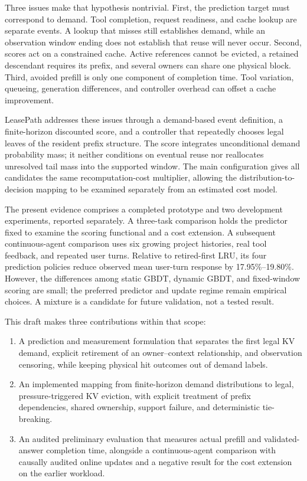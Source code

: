 \documentclass[sigconf, screen, review]{acmart}
\providecommand{\tightlist}{\setlength{\itemsep}{0pt}\setlength{\parskip}{0pt}}
\begin{document}
Three issues make that hypothesis nontrivial. First, the prediction
target must correspond to demand. Tool completion, request readiness,
and cache lookup are separate events. A lookup that misses still
establishes demand, while an observation window ending does not
establish that reuse will never occur. Second, scores act on a
constrained cache. Active references cannot be evicted, a retained
descendant requires its prefix, and several owners can share one
physical block. Third, avoided prefill is only one component of
completion time. Tool variation, queueing, generation differences, and
controller overhead can offset a cache improvement.

LeasePath addresses these issues through a demand-based event
definition, a finite-horizon discounted score, and a controller that
repeatedly chooses legal leaves of the resident prefix structure. The
score integrates unconditional demand probability mass; it neither
conditions on eventual reuse nor reallocates unresolved tail mass into
the supported window. The main configuration gives all candidates the
same recomputation-cost multiplier, allowing the
distribution-to-decision mapping to be examined separately from an
estimated cost model.

The present evidence comprises a completed prototype and two development
experiments, reported separately. A three-task comparison holds the
predictor fixed to examine the scoring functional and a cost extension.
A subsequent continuous-agent comparison uses six growing project
histories, real tool feedback, and repeated user turns. Relative to
retired-first LRU, its four prediction policies reduce observed mean
user-turn response by 17.95\%--19.80\%. However, the differences among
static GBDT, dynamic GBDT, and fixed-window scoring are small; the
preferred predictor and update regime remain empirical choices. A
mixture is a candidate for future validation, not a tested result.

This draft makes three contributions within that scope:

\begin{enumerate}
\def\labelenumi{\arabic{enumi}.}
\tightlist
\item
  A prediction and measurement formulation that separates the first
  legal KV demand, explicit retirement of an owner--context
  relationship, and observation censoring, while keeping physical hit
  outcomes out of demand labels.
\item
  An implemented mapping from finite-horizon demand distributions to
  legal, pressure-triggered KV eviction, with explicit treatment of
  prefix dependencies, shared ownership, support failure, and
  deterministic tie-breaking.
\item
  An audited preliminary evaluation that measures actual prefill and
  validated-answer completion time, alongside a continuous-agent
  comparison with causally audited online updates and a negative result
  for the cost extension on the earlier workload.
\end{enumerate}
\end{document}
